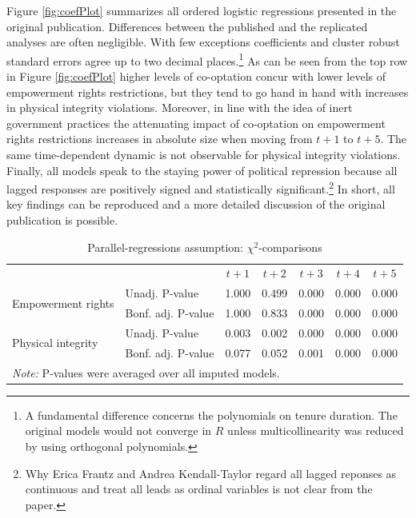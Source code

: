 Figure \ref{fig:coefPlot} summarizes all ordered logistic
regressions presented in the original publication. 
Differences between the published and the replicated 
analyses are often negligible. With few exceptions 
coefficients and cluster robust standard errors 
agree up to two decimal places.\footnote{A fundamental
difference concerns the polynomials on tenure duration. 
The original models would not converge in $R$ unless 
multicollinearity was reduced by using orthogonal 
polynomials.} As can be seen from the top row in 
Figure \ref{fig:coefPlot} higher levels of co-optation 
concur with lower levels of empowerment rights 
restrictions, but they tend to go hand in hand with 
increases in physical integrity violations. Moreover, in 
line with the idea of inert government practices the 
attenuating impact of co-optation on empowerment rights 
restrictions increases in absolute size when moving from
$t+1$ to $t+5$. The same time-dependent dynamic is not 
observable for physical integrity violations. Finally, all 
models speak to the staying power of political repression 
because all lagged responses are positively signed and
statistically significant.\footnote{Why 
Erica Frantz and Andrea Kendall-Taylor regard all lagged 
reponses as continuous and treat all leads as ordinal 
variables is not clear from the paper.} In short, all
key findings can be reproduced and a more detailed discussion of the original publication is possible.

\begin{table}[!htb]
\centering
\caption{Parallel-regressions assumption: $\chi^2$-comparisons}
\label{tbl:Chi2comparisons}
  \begin{tabular}{ll*{5}{c}} \toprule
    ~ & ~ & $t+1$ & $t+2$ & $t+3$ & $t+4$ & $t+5$ \\ \cmidrule{2-7}
    \multirow{2}{*}{Empowerment rights} & Unadj. P-value & 1.000 & 0.499 & 0.000 & 0.000 & 0.000 \\
    ~ & Bonf. adj. P-value & 1.000 & 0.833 & 0.000 & 0.000 & 0.000 \\
    \multirow{2}{*}{Physical integrity} & Unadj. P-value & 0.003 & 0.002 & 0.000 & 0.000 & 0.000 \\
    ~ & Bonf. adj. P-value & 0.077 & 0.052 & 0.001 & 0.000 & 0.000 \\ 
    \bottomrule
    \multicolumn{7}{l}{\textit{Note:} P-values were averaged over all imputed models.} \\
  \end{tabular}
\end{table}

